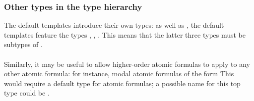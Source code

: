 \documentclass[../main.tex]{subfiles}
\begin{document}
\subsubsection{Other types in the type hierarchy}
The default templates introduce their own types: as well as , the default templates feature the types , , . This means that the latter three types must be subtypes of .
\\
\\
Similarly, it may be useful to allow higher-order atomic formulas to apply to any other atomic formula: for instance, modal atomic formulas of the form  This would require a default type for atomic formulas; a possible name for this top type could be .

\end{document}
